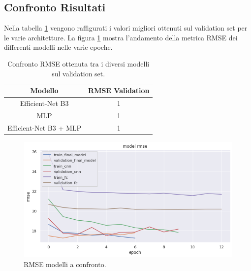 \newpage


\subsection{Confronto Risultati}


Nella tabella \ref{table:rmse} vengono raffigurati i valori migliori ottenuti sul validation set per le varie architetture. La figura \ref{fig:rmse-all} mostra l'andamento della metrica RMSE dei differenti modelli nelle varie epoche.

\vspace{1cm}

\begin{table}[h]
\caption{Confronto RMSE ottenuta tra i diversi modelli sul validation set.}
  \vspace{3mm}
\centering
\begin{tabular}{|c|c|}
\hline
\textbf{Modello}   & \textbf{RMSE Validation} \\ \hline \hline
Efficient-Net B3      & 1               \\ \hline
MLP       & 1               \\ \hline
Efficient-Net B3  + MLP & 1               \\ \hline
\end{tabular}
\label{table:rmse}
\end{table}

\vspace{1cm}

\begin{figure}[h]
    \centering
    
    \includegraphics[scale=0.6]{Plot/ALL_RMSE.png}
    \caption{RMSE modelli a confronto.}
    \label{fig:rmse-all}
\end{figure}





